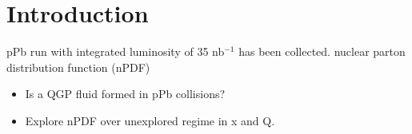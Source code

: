 \section*{Introduction}

pPb run with integrated luminosity of 35 nb$^{-1}$ has been collected.
nuclear parton distribution function (nPDF)


\begin{itemize}
\item Is a QGP fluid formed in pPb collisions?
\item Explore nPDF over unexplored regime in x and Q.
\end{itemize}
